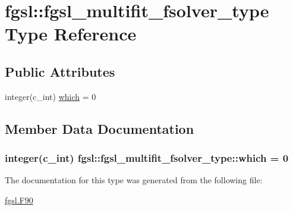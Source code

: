 \hypertarget{structfgsl_1_1fgsl__multifit__fsolver__type}{}\section{fgsl\+:\+:fgsl\+\_\+multifit\+\_\+fsolver\+\_\+type Type Reference}
\label{structfgsl_1_1fgsl__multifit__fsolver__type}
\subsection*{Public Attributes}
\begin{DoxyCompactItemize}
\item 
integer(c\+\_\+int) \hyperlink{structfgsl_1_1fgsl__multifit__fsolver__type_a2c8908118831ee27fef1176126635a9f}{which} = 0
\end{DoxyCompactItemize}


\subsection{Member Data Documentation}
\hypertarget{structfgsl_1_1fgsl__multifit__fsolver__type_a2c8908118831ee27fef1176126635a9f}{}
\subsubsection[{which}]{\setlength{\rightskip}{0pt plus 5cm}integer(c\+\_\+int) fgsl\+::fgsl\+\_\+multifit\+\_\+fsolver\+\_\+type\+::which = 0}\label{structfgsl_1_1fgsl__multifit__fsolver__type_a2c8908118831ee27fef1176126635a9f}


The documentation for this type was generated from the following file\+:\begin{DoxyCompactItemize}
\item 
\hyperlink{fgsl_8F90}{fgsl.\+F90}\end{DoxyCompactItemize}
